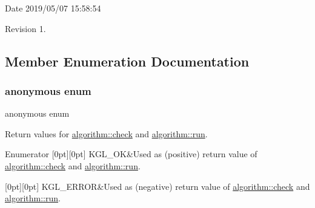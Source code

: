 \begin{DoxyParagraph}{Date}
2019/05/07 15\+:58\+:54 
\end{DoxyParagraph}
\begin{DoxyParagraph}{Revision}
1. 
\end{DoxyParagraph}


\subsection{Member Enumeration Documentation}
\mbox{\label{classalgorithm_af1a0078e153aa99c24f9bdf0d97f6710}} 
\subsubsection{\texorpdfstring{anonymous enum}{anonymous enum}}
{\footnotesize\ttfamily anonymous enum}



Return values for \mbox{\hyperlink{classalgorithm_a76361fb03ad1cf643affc51821e43bed}{algorithm\+::check}} and \mbox{\hyperlink{classalgorithm_a734b189509a8d6b56b65f8ff772d43ca}{algorithm\+::run}}. 

\begin{DoxyEnumFields}{Enumerator}
[0pt][0pt]{}\mbox{\label{classalgorithm_af1a0078e153aa99c24f9bdf0d97f6710aae4c1cd7fe8d8cf4b143241a6e7c31cf}} 
K\+G\+L\+\_\+\+OK&Used as (positive) return value of \mbox{\hyperlink{classalgorithm_a76361fb03ad1cf643affc51821e43bed}{algorithm\+::check}} and \mbox{\hyperlink{classalgorithm_a734b189509a8d6b56b65f8ff772d43ca}{algorithm\+::run}}. \\
\hline

[0pt][0pt]{}\mbox{\label{classalgorithm_af1a0078e153aa99c24f9bdf0d97f6710ae67bf27b2ef31f73e545a7f9f4a69556}} 
K\+G\+L\+\_\+\+E\+R\+R\+OR&Used as (negative) return value of \mbox{\hyperlink{classalgorithm_a76361fb03ad1cf643affc51821e43bed}{algorithm\+::check}} and \mbox{\hyperlink{classalgorithm_a734b189509a8d6b56b65f8ff772d43ca}{algorithm\+::run}}. \\
\hline

\end{DoxyEnumFields}


